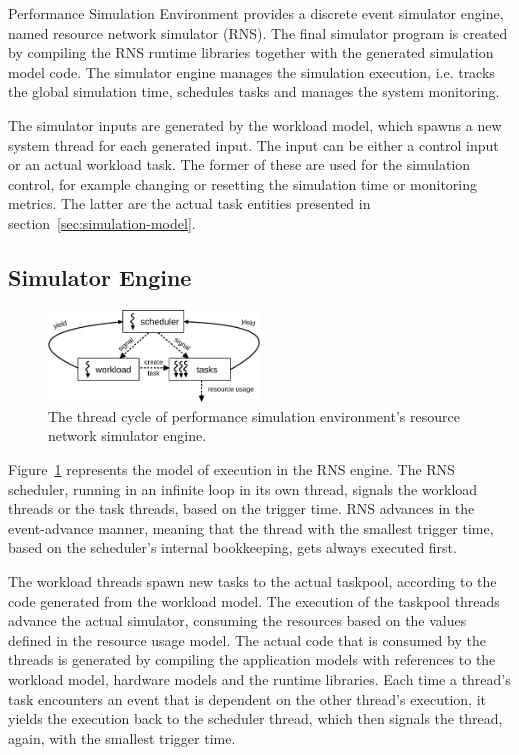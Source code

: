 Performance Simulation Environment provides a discrete event simulator engine, named resource network simulator (RNS). The final simulator program is created by compiling the RNS runtime libraries together with the generated simulation model code. The simulator engine manages the simulation execution, i.e. tracks the global simulation time, schedules tasks and manages the system monitoring.

The simulator inputs are generated by the workload model, which spawns a new system thread for each generated input. The input can be either a control input or an actual workload task. The former of these are used for the simulation control, for example changing or resetting the simulation time or monitoring metrics. The latter are the actual task entities presented in section~\ref{sec:simulation-model}.

\subsection{Simulator Engine}
\label{sec:simulator-engine}

\begin{figure}[]
  \begin{center}
    \includegraphics[width=0.5\textwidth]{images/rns-threads.pdf}
    \caption{The thread cycle of performance simulation environment's resource network simulator engine.}
    \label{fig:rns-threads}
  \end{center}
\end{figure}

Figure~\ref{fig:rns-threads} represents the model of execution in the RNS engine. The RNS scheduler, running in an infinite loop in its own thread, signals the workload threads or the task threads, based on the trigger time. RNS advances in the event-advance manner, meaning that the thread with the smallest trigger time, based on the scheduler's internal bookkeeping, gets always executed first.

The workload threads spawn new tasks to the actual taskpool, according to the code generated from the workload model. The execution of the taskpool threads advance the actual simulator, consuming the resources based on the values defined in the resource usage model. The actual code that is consumed by the threads is generated by compiling the application models with references to the workload model, hardware models and the runtime libraries. Each time a thread's task encounters an event that is dependent on the other thread's execution, it yields the execution back to the scheduler thread, which then signals the thread, again, with the smallest trigger time.

